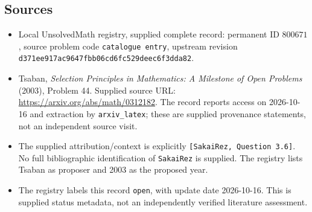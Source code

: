 \documentclass[11pt]{article}
\begin{document}
\subsection{Sources}
\begin{itemize}
\item Local UnsolvedMath registry, supplied complete record: permanent ID \(800671\), source problem code \texttt{catalogue entry}, upstream revision \texttt{d371ee917ac9647fbb06cd6fc529deec6f3dda82}.
\item Tsaban, \emph{Selection Principles in Mathematics: A Milestone of Open Problems} (2003), Problem 44. Supplied source URL: \url{https://arxiv.org/abs/math/0312182}. The record reports access on 2026-10-16 and extraction by \texttt{arxiv\_latex}; these are supplied provenance statements, not an independent source visit.
\item The supplied attribution/context is explicitly \texttt{[SakaiRez, Question 3.6]}. No full bibliographic identification of \texttt{SakaiRez} is supplied. The registry lists Tsaban as proposer and 2003 as the proposed year.
\item The registry labels this record \texttt{open}, with update date 2026-10-16. This is supplied status metadata, not an independently verified literature assessment.
\end{itemize}
\end{document}
